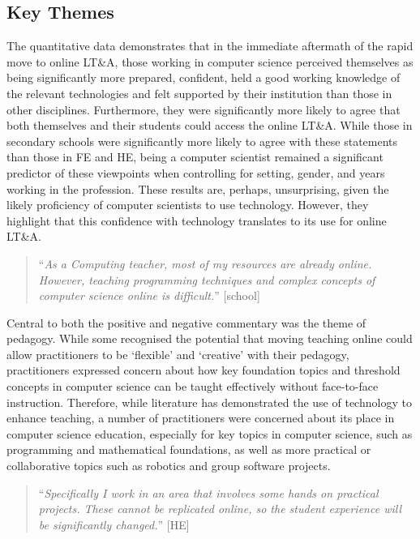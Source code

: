 \documentclass[sigconf]{acmart}
\begin{document}
\subsection{Key Themes}

The quantitative data demonstrates that in the immediate aftermath of
the rapid move to online LT\&A, those working in computer science
perceived themselves as being significantly more prepared, confident,
held a good working knowledge of the relevant technologies and felt
supported by their institution than those in other
disciplines. Furthermore, they were significantly more likely to agree
that both themselves and their students could access the online
LT\&A. While those in secondary schools were significantly more
likely to agree with these statements than those in FE and HE, being a
computer scientist remained a significant predictor of these
viewpoints when controlling for setting, gender, and years working in
the profession.  These results are, perhaps, unsurprising, given the
likely proficiency of computer scientists to use technology. However,
they highlight that this confidence with technology translates to its
use for online LT\&A.

\begin{quotation}
``{\emph{As a Computing teacher, most of my resources are already
online. However, teaching programming techniques and complex concepts
of computer science online is difficult.}}'' [school]
\end{quotation}

Central to both the positive and negative commentary was the theme of
pedagogy. While some recognised the potential that moving teaching
online could allow practitioners to be `flexible' and `creative' with
their pedagogy, practitioners expressed concern about how key
foundation topics and threshold concepts in computer science can be
taught effectively without face-to-face instruction. Therefore, while
literature has demonstrated the use of technology to enhance teaching,
a number of practitioners were concerned about its place in computer
science education, especially for key topics in computer science, such
as programming and mathematical foundations, as well as more practical
or collaborative topics such as robotics and group software projects.

\begin{quotation}
``{\emph{Specifically I work in an area that involves some hands on practical
projects. These cannot be replicated online, so the student experience
will be significantly changed.}}'' [HE]
\end{quotation}
\end{document}
